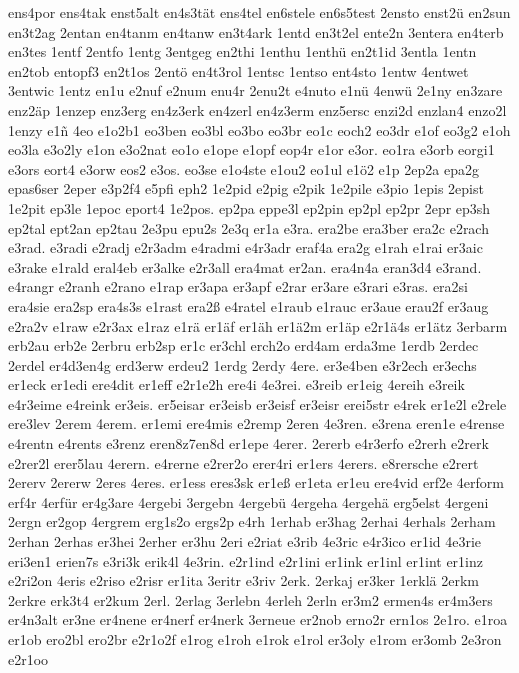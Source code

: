 {ens4por
ens4tak
enst5alt
en4s3tät
ens4tel
en6stele
en6s5test
2ensto
enst2ü
en2sun
en3t2ag
2entan
en4tanm
en4tanw
en3t4ark
1entd
en3t2el
ente2n
3entera
en4terb
en3tes
1entf
2entfo
1entg
3entgeg
en2thi
1enthu
1enthü
en2t1id
3entla
1entn
en2tob
entopf3
en2t1os
2entö
en4t3rol
1entsc
1entso
ent4sto
1entw
4entwet
3entwic
1entz
en1u
e2nuf
e2num
enu4r
2enu2t
e4nuto
e1nü
4enwü
2e1ny
en3zare
enz2äp
1enzep
enz3erg
en4z3erk
en4zerl
en4z3erm
enz5ersc
enzi2d
enzlan4
enzo2l
1enzy
e1ñ
4eo
e1o2b1
eo3ben
eo3bl
eo3bo
eo3br
eo1c
eoch2
eo3dr
e1of
eo3g2
e1oh
eo3la
e3o2ly
e1on
e3o2nat
eo1o
e1ope
e1opf
eop4r
e1or
e3or.
eo1ra
e3orb
eorgi1
e3ors
eort4
e3orw
eos2
e3os.
eo3se
e1o4ste
e1ou2
eo1ul
e1ö2
e1p
2ep2a
epa2g
epas6ser
2eper
e3p2f4
e5pfi
eph2
1e2pid
e2pig
e2pik
1e2pile
e3pio
1epis
2epist
1e2pit
ep3le
1epoc
eport4
1e2pos.
ep2pa
eppe3l
ep2pin
ep2pl
ep2pr
2epr
ep3sh
ep2tal
ept2an
ep2tau
2e3pu
epu2s
2e3q
er1a
e3ra.
era2be
era3ber
era2c
e2rach
e3rad.
e3radi
e2radj
e2r3adm
e4radmi
e4r3adr
eraf4a
era2g
e1rah
e1rai
er3aic
e3rake
e1rald
eral4eb
er3alke
e2r3all
era4mat
er2an.
era4n4a
eran3d4
e3rand.
e4rangr
e2ranh
e2rano
e1rap
er3apa
er3apf
e2rar
er3are
e3rari
e3ras.
era2si
era4sie
era2sp
era4s3s
e1rast
era2ß
e4ratel
e1raub
e1rauc
er3aue
erau2f
er3aug
e2ra2v
e1raw
e2r3ax
e1raz
e1rä
er1äf
er1äh
er1ä2m
er1äp
e2r1ä4s
er1ätz
3erbarm
erb2au
erb2e
2erbru
erb2sp
er1c
er3chl
erch2o
erd4am
erda3me
1erdb
2erdec
2erdel
er4d3en4g
erd3erw
erdeu2
1erdg
2erdy
4ere.
er3e4ben
e3r2ech
er3echs
er1eck
er1edi
ere4dit
er1eff
e2r1e2h
ere4i
4e3rei.
e3reib
er1eig
4ereih
e3reik
e4r3eime
e4reink
er3eis.
er5eisar
er3eisb
er3eisf
er3eisr
erei5str
e4rek
er1e2l
e2rele
ere3lev
2erem
4erem.
er1emi
ere4mis
e2remp
2eren
4e3ren.
e3rena
eren1e
e4rense
e4rentn
e4rents
e3renz
eren8z7en8d
er1epe
4erer.
2ererb
e4r3erfo
e2rerh
e2rerk
e2rer2l
erer5lau
4erern.
e4rerne
e2rer2o
erer4ri
er1ers
4erers.
e8rersche
e2rert
2ererv
2ererw
2eres
4eres.
er1ess
eres3sk
er1eß
er1eta
er1eu
ere4vid
erf2e
4erform
erf4r
4erfür
er4g3are
4ergebi
3ergebn
4ergebü
4ergeha
4ergehä
erg5elst
4ergeni
2ergn
er2gop
4ergrem
erg1s2o
ergs2p
e4rh
1erhab
er3hag
2erhai
4erhals
2erham
2erhan
2erhas
er3hei
2erher
er3hu
2eri
e2riat
e3rib
4e3ric
e4r3ico
er1id
4e3rie
eri3en1
erien7s
e3ri3k
erik4l
4e3rin.
e2r1ind
e2r1ini
er1ink
er1inl
er1int
er1inz
e2ri2on
4eris
e2riso
e2risr
er1ita
3eritr
e3riv
2erk.
2erkaj
er3ker
1erklä
2erkm
2erkre
erk3t4
er2kum
2erl.
2erlag
3erlebn
4erleh
2erln
er3m2
ermen4s
er4m3ers
er4n3alt
er3ne
er4nene
er4nerf
er4nerk
3erneue
er2nob
erno2r
ern1os
2e1ro.
e1roa
er1ob
ero2bl
ero2br
e2r1o2f
e1rog
e1roh
e1rok
e1rol
er3oly
e1rom
er3omb
2e3ron
e2r1oo
}
